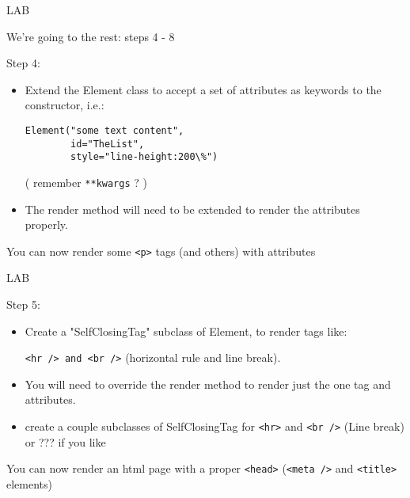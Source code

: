 \documentclass{beamer}
\begin{document}
\begin{frame}[fragile]{LAB}

{\Large We're going to the rest: steps 4 - 8}

\vfill
{\Large Step 4:}

\begin{itemize}
  \item Extend the Element class to accept a set of attributes as keywords to the
  constructor, i.e.:
  \begin{verbatim}
Element("some text content",
        id="TheList",
        style="line-height:200\%")
  \end{verbatim}
    ( remember \verb|**kwargs| ? )
  \item The render method will need to be extended to render the attributes properly.
\end{itemize}

\vfill
You can now render some \verb|<p>| tags (and others) with attributes  
\end{frame}

\begin{frame}[fragile]{LAB}

{\Large Step 5:}

\begin{itemize}
   \item Create a "SelfClosingTag" subclass of Element, to render tags like:
   
   \verb|<hr /> and <br />| (horizontal rule and line break).
   
   \item You will need to override the render method to render just the one tag and
   attributes.
   
   \item create a couple subclasses of SelfClosingTag for \verb|<hr>|
   and \verb|<br />| (Line break) or ??? if you like
   \end{itemize}

\vfill
You can now render an html page with a proper \verb|<head>| (\verb|<meta />| and \verb|<title>| elements)
\end{frame}
\end{document}

